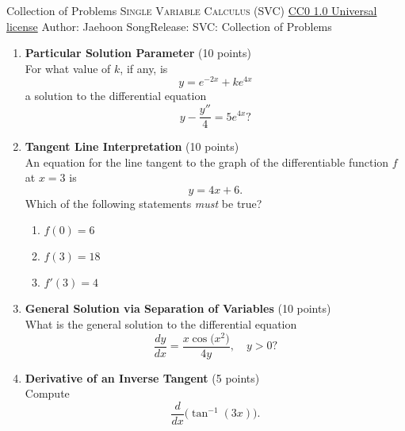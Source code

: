 \handout
{Collection of Problems}
{\textsc{Single Variable Calculus (SVC)}}
{\href{https://creativecommons.org/publicdomain/zero/1.0/}{CC0 1.0 Universal license}}
{Author: Jaehoon Song}{Release: \generatedOn}
{SVC: Collection of Problems}



\begin{enumerate}
  \item \textbf{Particular Solution Parameter} (10 points)\\
  For what value of $k$, if any, is
  \[
    y = e^{-2x} + k e^{4x}
  \]
  a solution to the differential equation
  \[
    y - \frac{y''}{4} = 5 e^{4x}?
  \]
  \begin{subanswer}
  \end{subanswer}

  \item \textbf{Tangent Line Interpretation} (10 points)\\
  An equation for the line tangent to the graph of the differentiable function $f$ at $x = 3$ is
  \[
    y = 4x + 6.
  \]
  Which of the following statements \emph{must} be true?\\
  \begin{enumerate}[label=(\Roman*)]
    \item $f(0) = 6$
    \item $f(3) = 18$
    \item $f'(3) = 4$
  \end{enumerate}
  \begin{subanswer}
  \end{subanswer}

  \item \textbf{General Solution via Separation of Variables} (10 points)\\
  What is the general solution to the differential equation
  \[
    \frac{dy}{dx} = \frac{x \cos\bigl(x^2\bigr)}{4y},
    \quad y > 0?
  \]
  \begin{subanswer}
  \end{subanswer}

  \item \textbf{Derivative of an Inverse Tangent} (5 points)\\
  Compute
  \[
    \frac{d}{dx}\bigl(\tan^{-1}(3x)\bigr).
  \]
  \begin{subanswer}
  \end{subanswer}


\end{enumerate}
